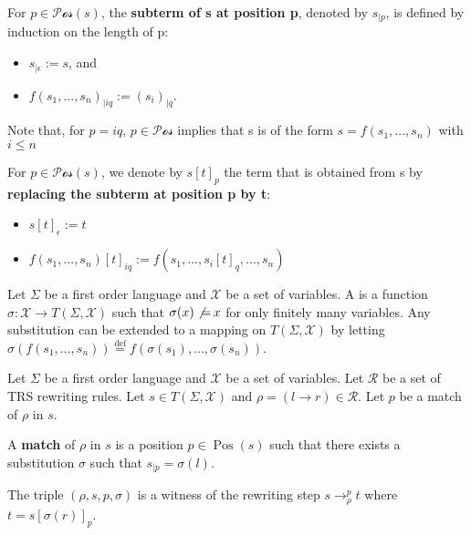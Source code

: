 \documentclass{book}
\begin{document}
  \begin{definition}
    For $p \mathop{\in} \mathcal{Pos}(s)$, the \textbf{subterm of s at position p}, denoted by $s_{|p}$, is defined by induction on the length of p:
    \begin{itemize}
      \item $s_{|\epsilon} := s$, and
      \item $f(s_1,...,s_n)_{|iq} := \left(s_i\right)_{|q}$.
    \end{itemize} 
    
    Note that, for $p \mathop{=} iq$, $p \mathop{\in} \mathcal{Pos}$ implies that s is of the form $s \mathop{=} f(s_1,...,s_n)$ with $i \le n$
    
    For $p \mathop{\in} \mathcal{Pos}(s)$, we denote by $s[t]_p$ the term that is obtained from s by \textbf{replacing the subterm at position p by t}:
  \begin{itemize}
    \item $s[t]_\epsilon := t$
    \item $f(s_1,...,s_n)[t]_{iq} := f(s_1,...,s_i[t]_{q},...,s_n)$
  \end{itemize}
 
  \end{definition}
   
  \begin{definition}[Substitution]
    Let $\Sigma$ be a first order language and $\mathcal{X}$ be a set of variables.
    A  is a function $\sigma : \mathcal{X} \mathop{\rightarrow} T(\Sigma, \mathcal{X})$ such that $\sigma(x) \not \mathop{=} x$ for only finitely many variables. Any substitution can be extended to a mapping on $T(\Sigma,\mathcal{X})$ by letting $\sigma(f(s_1,...,s_n)) \overset{\operatorname{def}}{=}f(\sigma(s_1),...,\sigma(s_n))$.
  \end{definition}

   
  \begin{definition}
    \label{def:trs:rewriting}
    Let $\Sigma$ be a first order language and $\mathcal{X}$ be a set of variables. Let $\mathcal{R}$ be a set of TRS rewriting rules. Let $s \mathop{\in} T(\Sigma, \mathcal{X})$ and $\rho \mathop{=} (l \mathop{\to} r) \mathop{\in} \mathcal{R}$. Let $p$ be a match of $\rho$ in $s$.

      A \textbf{match} of $\rho$ in $s$ is a position $p \mathop{\in} \operatorname{Pos}(s)$ such that there exists a substitution $\sigma$ such that $s_{|p} \mathop{=} \sigma(l)$.

    The triple $(\rho, s, p, \sigma)$ is a witness of the rewriting step $s \mathop{\to} _\rho^p t$ where $t \mathop{=} s[\sigma(r)]_p$.
  \end{definition}
  
\end{document}
